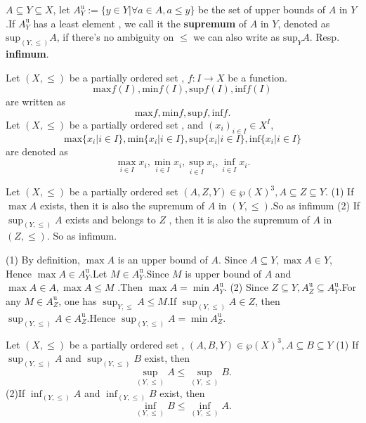 \documentclass{book}
\numberwithin{equation}{section}
\begin{document}
\begin{definitionenv}
    $A\subseteq Y\subseteq X$, let $A_Y^\mathrm{u}:=\{y\in Y|\forall a\in A, a\le y\}$ be the set of upper bounds of $A$ in $Y$.If $A_Y^\mathrm{u}$ has a least element , we call it the \textbf{supremum} of $A$ in $Y$,  denoted as $\mathrm{sup}_{(Y, \le)}A$,  if there's no ambiguity on $\le$ we can also write as $\mathrm{sup}_{Y}A$. Resp. \textbf{infimum}.
\end{definitionenv}
\begin{notationenv}\label{notation4.5.1}
    
         Let $(X, \le)$ be a partially ordered set , $f:I\rightarrow X$ be a function.$$\mathrm{max}f(I), \mathrm{min}f(I), \mathrm{sup}f(I), \mathrm{inf}f(I)$$ are written as $$\mathrm{max}f, \mathrm{min}f, \mathrm{sup}f, \mathrm{inf}f.$$
         Let $(X, \le)$ be a partially ordered set , and $(x_i)_{i\in I}\in X^I$, $$\mathrm{max}\{x_i|i\in I\}, \mathrm{min}\{x_i|i\in I\}, \mathrm{sup}\{x_i|i\in I\}, \mathrm{inf}\{x_i|i\in I\}$$ are denoted as $$\max _{i\in I}x_i, \min _{i\in I}x_i, \sup _{i\in I}x_i, \inf _{i\in I}x_i.$$
    
\end{notationenv}
\begin{propositionenv}\label{proposition4.5.1}
    \quad
    \newline
    Let $(X, \le)$ be a partially ordered set $(A, Z, Y)\in \wp (X)^3, A\subseteq Z\subseteq Y$.
    \newline
   (1) If $\max A$ exists, then it is also the supremum of $A$ in $(Y, \le)$.So as infimum
    \newline
    (2) If $\sup_{(Y, \le)}A$ exists and belongs to $Z$ , then it is also the supremum of $A$ in $(Z, \le)$. So as infimum.
\end{propositionenv}
\begin{proofenv}
    \quad \newline
   (1) By definition, $\max A $ is an upper bound of $A$. Since $A\subseteq Y,  \max A \in Y$, Hence $\max A\in A_Y^\mathrm{u}$.Let $M\in A_Y^\mathrm{u} $.Since $M$ is upper bound of $A$ and $\max A\in A, \max A\le M$ .Then $\max A=\min A_Y^\mathrm{u}$.
\newline
(2) Since $Z\subseteq Y, A_Z^\mathrm{u}\subseteq A_Y^\mathrm{u}$.For any $M\in A_Z^\mathrm{u}$, one has $\sup _{Y, \le}A\le M$.If $\sup_{(Y, \le)}A\in Z$, then $\sup_{(Y, \le)}A\in A_Z^\mathrm{u}$.Hence $\sup _{(Y, \le)}A=\min A_Z^\mathrm{u}$.
\end{proofenv}
\begin{propositionenv}\label{proposition4.5.2}
    \quad
    \newline
    Let $(X, \le )$ be a partially ordered set , $(A, B, Y)\in \wp (X)^3, A\subseteq B\subseteq Y$
    \newline
    (1) If $\sup_{(Y, \le)}A$ and $\sup_{(Y, \le)}B$ exist,  then $$\sup_{(Y, \le)}A \le \sup_{(Y, \le)}B.$$
    \newline
    (2)If $\inf_{(Y, \le)}A$ and $\inf_{(Y, \le)}B$ exist,  then $$\inf_{(Y, \le)}B \le \inf_{(Y, \le)}A.$$
    
\end{propositionenv}
\end{document}
